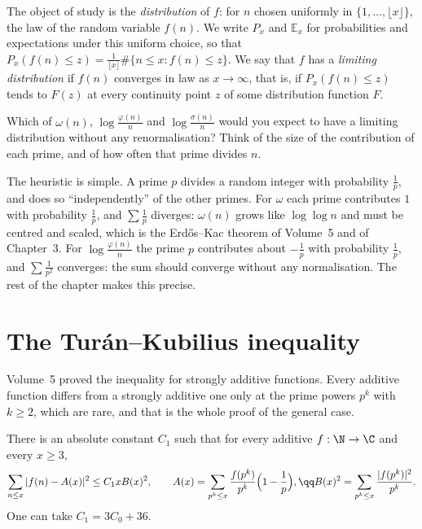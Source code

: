 The object of study is the \emph{distribution} of $f$: for $n$ chosen uniformly in $\{1,\dots,\lfloor x\rfloor\}$, the law of the random variable $f(n)$. We write $P_x$ and $\mathbb E_x$ for probabilities and expectations under this uniform choice, so that $P_x(f(n)\le z)=\frac1{\lfloor x\rfloor}\#\{n\le x:f(n)\le z\}$. We say that $f$ has a \emph{limiting distribution} if $f(n)$ converges in law as $x\to\infty$, that is, if $P_x(f(n)\le z)$ tends to $F(z)$ at every continuity point $z$ of some distribution function $F$.

\begin{think}
Which of $\omega(n)$, $\log\frac{\varphi(n)}n$ and $\log\frac{\sigma(n)}n$ would you expect to have a limiting distribution without any renormalisation? Think of the size of the contribution of each prime, and of how often that prime divides $n$.
\end{think}

The heuristic is simple. A prime $p$ divides a random integer with probability $\frac1p$, and does so ``independently'' of the other primes. For $\omega$ each prime contributes $1$ with probability $\frac1p$, and $\sum\frac1p$ diverges: $\omega(n)$ grows like $\log\log n$ and must be centred and scaled, which is the Erd\H{o}s--Kac theorem of Volume~5 and of Chapter~3. For $\log\frac{\varphi(n)}n$ the prime $p$ contributes about $-\frac1p$ with probability $\frac1p$, and $\sum\frac1{p^2}$ converges: the sum should converge without any normalisation. The rest of the chapter makes this precise.

\section{The Tur\'an--Kubilius inequality}

Volume~5 proved the inequality for strongly additive functions. Every additive function differs from a strongly additive one only at the prime powers $p^k$ with $k\ge2$, which are rare, and that is the whole proof of the general case.

\begin{theorem}\label{thm:tkgeneral}
There is an absolute constant $C_1$ such that for every additive $f:\N\to\C$ and every $x\ge3$,
\[
\sum_{n\le x}|f(n)-A(x)|^2\le C_1xB(x)^2,\qquad A(x)=\sum_{p^k\le x}\frac{f(p^k)}{p^k}\Bigl(1-\frac1p\Bigr),\qq B(x)^2=\sum_{p^k\le x}\frac{|f(p^k)|^2}{p^k}.
\]
One can take $C_1=3C_0+36$.
\end{theorem}

